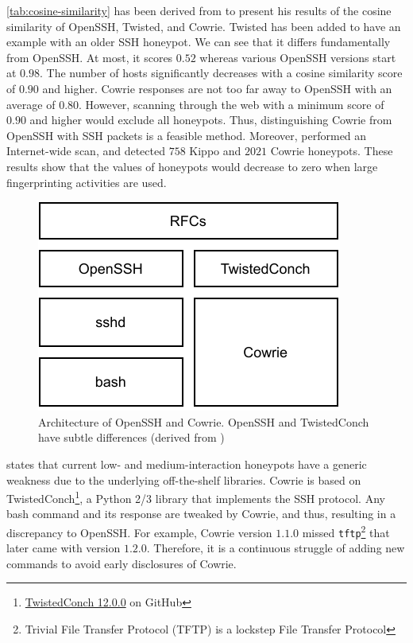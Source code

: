 \autoref{tab:cosine-similarity} has been derived from \citet{vetterl2020} to present his results of the cosine similarity of OpenSSH, Twisted, and Cowrie.
Twisted has been added to have an example with an older SSH honeypot.
We can see that it differs fundamentally from OpenSSH.
At most, it scores $0.52$ whereas various OpenSSH versions start at $0.98$.
The number of hosts significantly decreases with a cosine similarity score of $0.90$ and higher.
Cowrie responses are not too far away to OpenSSH with an average of $0.80$.
However, scanning through the web with a minimum score of $0.90$ and higher would exclude all honeypots.
Thus, distinguishing Cowrie from OpenSSH with SSH packets is a feasible method.
Moreover, \citet{vetterl2020} performed an Internet-wide scan, and detected $758$ Kippo and $2021$ Cowrie honeypots.
These results show that the values of honeypots would decrease to zero when large fingerprinting activities are used.

\begin{figure}[ht]
    \centering
    \includegraphics{figures/cowrie-openssh.pdf}
    \caption[Architecture of OpenSSH and Cowrie]{Architecture of OpenSSH and Cowrie. OpenSSH and TwistedConch have subtle differences (derived from \cite{vetterl2020})}
    \label{fig:cowrie-openssh}
\end{figure}

\citet{vetterl2020} states that current low- and medium-interaction honeypots have a generic weakness due to the underlying off-the-shelf libraries.
Cowrie is based on TwistedConch\footnote{\href{https://github.com/racker/python-twisted-conch/commit/01f22a3a8534856e934ed716cfc251b04e7d2077}{TwistedConch 12.0.0} on GitHub}, a Python 2/3 library that implements the SSH protocol.
Any bash command and its response are tweaked by Cowrie, and thus, resulting in a discrepancy to OpenSSH.
For example, Cowrie version $1.1.0$ missed \verb|tftp|\footnote{Trivial File Transfer Protocol (TFTP) is a lockstep File Transfer Protocol} that later came with version $1.2.0$.
Therefore, it is a continuous struggle of adding new commands to avoid early disclosures of Cowrie.

